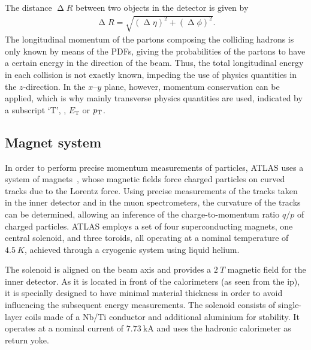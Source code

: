 The distance $\upDelta R$ between two objects in the detector is given by
\begin{align}
	\upDelta R=\sqrt{\left(\upDelta \eta\right)^2+\left(\upDelta \phi\right)^2}.
\end{align}
The longitudinal momentum of the partons composing the colliding hadrons is only known by means of the \glspl{PDF}, giving the probabilities of the partons to have a certain energy in the direction of the beam. Thus, the total longitudinal energy in each collision is not exactly known, impeding the use of physics quantities in the $z$-direction. In the $x$--$y$ plane, however, momentum conservation can be applied, which is why mainly transverse physics quantities are used, indicated by a subscript `T', \eg, $E_\mathrm{T}$ or $p_{\mathrm{T}}$.

\subsection{Magnet system}

In order to perform precise momentum measurements of particles, ATLAS uses a system of magnets~\cite{Aad:2008zzm}, whose magnetic fields force charged particles on curved tracks due to the Lorentz force.
Using precise measurements of the tracks taken in the inner detector and in the muon spectrometers, the curvature of the tracks can be determined, allowing an inference of the charge-to-momentum ratio $q/p$ of charged particles.
ATLAS employs a set of four superconducting magnets, one central solenoid, and three toroids, all operating at a nominal temperature of $\SI{4.5}{K}$, achieved through a cryogenic system using liquid helium. 

The solenoid is aligned on the beam axis and provides a $\SI{2}{T}$ magnetic field for the inner detector.
As it is located in front of the calorimeters (as seen from the \gls{ip}), it is specially designed to have minimal material thickness in order to avoid influencing the subsequent energy measurements.
The solenoid consists of single-layer coils made of a Nb/Ti conductor and additional aluminium for stability.
It operates at a nominal current of $\SI{7.73}{\kilo\ampere}$ and uses the hadronic calorimeter as return yoke.

